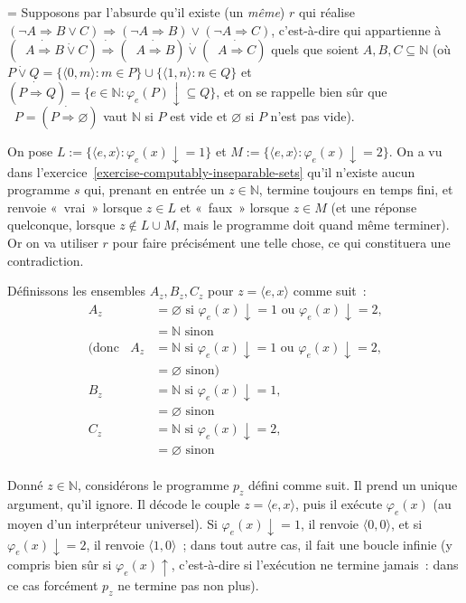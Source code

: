 \documentclass[12pt,a4paper]{article}
\theoremstyle{definition}
\newcommand{\dottedlimp}{\mathbin{\dot\Rightarrow}}
\newcommand{\dottedlor}{\mathbin{\dot\lor}}
\newcommand{\dottedneg}{\mathop{\dot\neg}}
\newif\ifcorrige
\newenvironment{corrige}%
{\ifcorrige\relax\else\setbox0=\vbox\bgroup\fi%
\smallbreak\footnotesize\noindent{\underbar{\textit{Corrigé.}}\quad}}
{{\hbox{}\nobreak\hfill\checkmark}%
\ifcorrige\relax\else\egroup\fi\par}
\begin{document}
\begin{corrige}
Supposons par l'absurde qu'il existe (un \emph{même}) $r$ qui réalise
$(\neg A \Rightarrow B\lor C) \Rightarrow (\neg A\Rightarrow B) \lor
(\neg A\Rightarrow C)$, c'est-à-dire qui appartienne à $(\dottedneg A
\dottedlimp B\dottedlor C) \dottedlimp (\dottedneg A\dottedlimp B)
\dottedlor (\dottedneg A\dottedlimp C)$ quels que soient
$A,B,C\subseteq \mathbb{N}$ (où $P \dottedlor Q = \{\langle 0,m\rangle
: m\in P\} \cup \{\langle 1,n\rangle : n\in Q\}$ et $(P \dottedlimp Q)
= \{e \in \mathbb{N} : \varphi_e(P){\downarrow} \subseteq Q\}$, et on
se rappelle bien sûr que $\dottedneg P = (P\dottedlimp \varnothing)$
vaut $\mathbb{N}$ si $P$ est vide et $\varnothing$ si $P$ n'est pas
vide).

On pose $L := \{\langle e,x\rangle : \varphi_e(x){\downarrow} = 1\}$
et $M := \{\langle e,x\rangle : \varphi_e(x){\downarrow} = 2\}$.  On a
vu dans l'exercice \ref{exercise-computably-inseparable-sets} qu'il
n'existe aucun programme $s$ qui, prenant en entrée un
$z\in\mathbb{N}$, termine toujours en temps fini, et renvoie « vrai »
lorsque $z \in L$ et « faux » lorsque $z \in M$ (et une réponse
quelconque, lorsque $z \not\in L\cup M$, mais le programme doit quand
même terminer).  Or on va utiliser $r$ pour faire précisément une
telle chose, ce qui constituera une contradiction.

Définissons les ensembles $A_z,B_z,C_z$ pour $z = \langle e,x\rangle$
comme suit :
\[
\begin{aligned}
A_z &= \varnothing \text{~si~$\varphi_e(x){\downarrow} = 1$ ou
  $\varphi_e(x){\downarrow} = 2$,}\\
&= \mathbb{N} \text{~sinon}\\
\text{(donc~}\dottedneg A_z &= \mathbb{N} \text{~si~$\varphi_e(x){\downarrow} = 1$ ou
  $\varphi_e(x){\downarrow} = 2$,}\\
&= \varnothing \text{~sinon)}\\
B_z &= \mathbb{N} \text{~si~$\varphi_e(x){\downarrow} = 1$,}\\
&= \varnothing \text{~sinon}\\
C_z &= \mathbb{N} \text{~si~$\varphi_e(x){\downarrow} = 2$,}\\
&= \varnothing \text{~sinon}\\
\end{aligned}
\]

Donné $z\in \mathbb{N}$, considérons le programme $p_z$ défini comme
suit.  Il prend un unique argument, qu'il ignore.  Il décode le couple
$z = \langle e,x\rangle$, puis il exécute $\varphi_e(x)$ (au moyen
d'un interpréteur universel).  Si $\varphi_e(x){\downarrow} = 1$, il
renvoie $\langle 0,0\rangle$, et si $\varphi_e(x){\downarrow} = 2$, il
renvoie $\langle 1,0\rangle$ ; dans tout autre cas, il fait une boucle
infinie (y compris bien sûr si $\varphi_e(x){\uparrow}$, c'est-à-dire
si l'exécution ne termine jamais : dans ce cas forcément $p_z$ ne
termine pas non plus).


\end{corrige}
\end{document}

